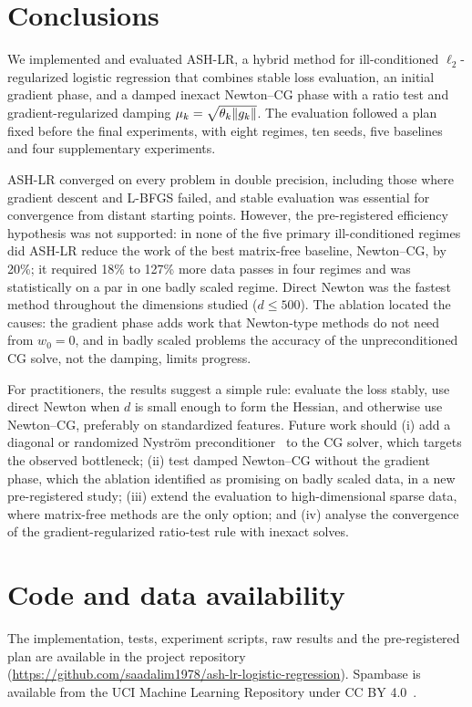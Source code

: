 \section{Conclusions}\label{sec:conclusion}

We implemented and evaluated ASH-LR, a hybrid method for ill-conditioned
$\ell_2$-regularized logistic regression that combines stable loss evaluation, an
initial gradient phase, and a damped inexact Newton--CG phase with a ratio test and
gradient-regularized damping $\mu_k=\sqrt{\theta_k\lVert g_k\rVert}$. The evaluation
followed a plan fixed before the final experiments, with eight regimes, ten seeds,
five baselines and four supplementary experiments.

ASH-LR converged on every problem in double precision, including those where
gradient descent and L-BFGS failed, and stable evaluation was essential for
convergence from distant starting points. However, the pre-registered efficiency
hypothesis was not supported: in none of the five primary ill-conditioned regimes
did ASH-LR reduce the work of the best matrix-free baseline, Newton--CG, by 20\%;
it required 18\% to 127\% more data passes in four regimes and was statistically on
a par in one badly scaled regime. Direct Newton was the fastest method throughout the dimensions
studied ($d\le500$). The ablation located the causes: the gradient phase adds work
that Newton-type methods do not need from $w_0=0$, and in badly scaled problems the
accuracy of the unpreconditioned CG solve, not the damping, limits progress.

For practitioners, the results suggest a simple rule: evaluate the loss stably, use
direct Newton when $d$ is small enough to form the Hessian, and otherwise use
Newton--CG, preferably on standardized features. Future work should
(i) add a diagonal or randomized Nystr\"om preconditioner~\cite{frangella2023randomized} to the CG solver, which targets the observed
bottleneck; (ii) test damped Newton--CG without the gradient phase, which the
ablation identified as promising on badly scaled data, in a new pre-registered study;
(iii) extend the evaluation to high-dimensional sparse data, where matrix-free
methods are the only option; and (iv) analyse the convergence of the
gradient-regularized ratio-test rule with inexact solves.

\section*{Code and data availability}
The implementation, tests, experiment scripts, raw results and the pre-registered
plan are available in the project repository (\url{https://github.com/saadalim1978/ash-lr-logistic-regression}). Spambase is
available from the UCI Machine Learning Repository under CC BY 4.0~\cite{spambase}.
